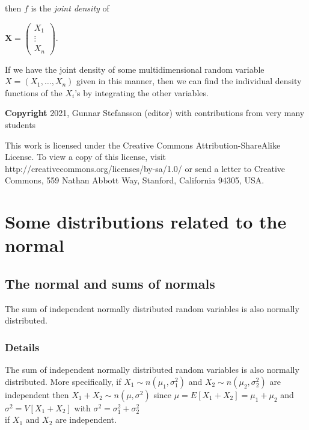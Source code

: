 \documentclass[12pt,a4paper]{article}
\theoremstyle{regla}
\theoremstyle{remark}
\theoremstyle{definition}
\theoremstyle{nonumberbreak}
\begin{document}
then $f$ is the {\em joint density} of

$\mathbf{X}= \left( \begin{array}{ccc}
  X_1 \\ 
  \vdots \\
  X_n
  \end{array}\right).$

If we have the joint density of some multidimensional random variable $X=(X_1,\ldots,X_n)$ given in this manner, then we can find the individual density functions of the $X_i$'s by integrating the other variables.

{\bf Copyright}
2021, Gunnar Stefansson (editor) with contributions from very many students

This work is licensed under the Creative Commons
Attribution-ShareAlike License. To view a copy of this license, visit
http://creativecommons.org/licenses/by-sa/1.0/ or send a letter to
Creative Commons, 559 Nathan Abbott Way, Stanford, California 94305,
USA.
\clearpage
\section{Some distributions related to the normal}
\subsection{The normal and sums of normals}
\begin{fbox}
\begin{minipage}{0.97\textwidth}
The sum of independent normally distributed random variables is also normally distributed. 
\end{minipage}
\end{fbox}
\subsubsection{Details}
The sum of independent normally distributed random variables is also normally distributed. More specifically, if $X_1 \sim n(\mu_1, \sigma_{1}^2)$ and $X_2 \sim n(\mu_2, \sigma_{2}^2)$ are independent then $X_1 + X_2 \sim n(\mu, \sigma^2)$ since $\mu = E \left[ X_1 + X_2 \right] = \mu_1 + \mu_2$ and \\
$\sigma^2 = V \left[ X_1 + X_2 \right]$ with $\sigma^2 = \sigma_{1}^2 + \sigma_{2}^2 $ \\
if $X_1$ and $X_2$ are independent. \\
\end{document}
